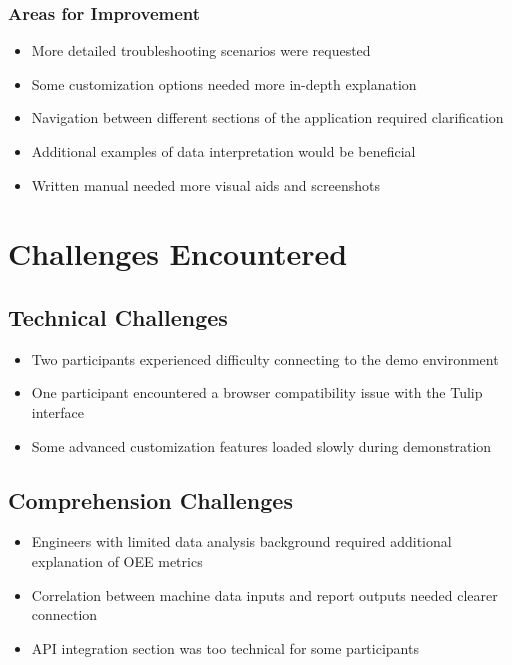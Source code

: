 \documentclass[12pt, letterpaper]{article}
\begin{document}
\subsubsection{Areas for Improvement}
\begin{itemize}
    \item More detailed troubleshooting scenarios were requested
    \item Some customization options needed more in-depth explanation
    \item Navigation between different sections of the application required clarification
    \item Additional examples of data interpretation would be beneficial
    \item Written manual needed more visual aids and screenshots
\end{itemize}

\section{Challenges Encountered}

\subsection{Technical Challenges}
\begin{itemize}
    \item Two participants experienced difficulty connecting to the demo environment
    \item One participant encountered a browser compatibility issue with the Tulip interface
    \item Some advanced customization features loaded slowly during demonstration
\end{itemize}

\subsection{Comprehension Challenges}
\begin{itemize}
    \item Engineers with limited data analysis background required additional explanation of OEE metrics
    \item Correlation between machine data inputs and report outputs needed clearer connection
    \item API integration section was too technical for some participants
\end{itemize}
\end{document}

